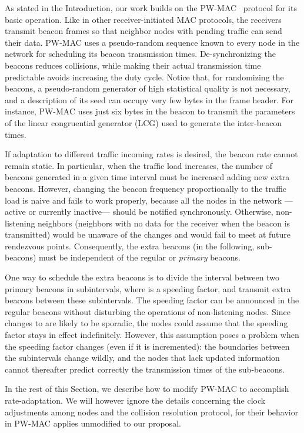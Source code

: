 \documentclass[journal,english,twocolumn,10pt,letterpaper]{IEEEtran}
\begin{document}
As stated in the Introduction, our work builds on the
PW-MAC~\cite{tang11:_pw_macy} protocol for its basic operation. Like in other
receiver-initiated MAC protocols, the receivers transmit beacon frames so that
neighbor nodes with pending traffic can send their data. PW-MAC uses a
pseudo-random sequence known to every node in the network for scheduling its
beacon transmission times. De-synchronizing the beacons reduces collisions,
while making their actual transmission time predictable avoids increasing the
duty cycle. Notice that, for randomizing the beacons, a pseudo-random
generator of high statistical quality is not necessary, and a description of
its seed can occupy very few bytes in the frame header. For instance, PW-MAC
uses just six bytes in the beacon to transmit the parameters of the linear
congruential generator (LCG) used to generate the inter-beacon times.

If adaptation to different traffic incoming rates is desired, the beacon rate
cannot remain static. In particular, when the traffic load increases, the
number of beacons generated in a given time interval must be increased adding
new extra beacons. However, changing the beacon frequency proportionally to
the traffic load is naive and fails to work properly, because all the nodes in
the network ---active or currently inactive--- should be notified
synchronously. Otherwise, non-listening neighbors (neighbors with no data for
the receiver when the beacon is transmitted) would be unaware of the changes
and would fail to meet at future rendezvous points. Consequently, the extra
beacons (in the following, sub-beacons) must be independent of the regular or
\emph{primary} beacons.

One way to schedule the extra beacons is to divide the interval between two
primary beacons in  subintervals, where  is a speeding factor, and
transmit extra beacons between these subintervals. The speeding factor can be
announced in the regular beacons without disturbing the operations of
non-listening nodes. Since changes to  are likely to be sporadic, the nodes
could assume that the speeding factor stays in effect indefinitely. However,
this assumption poses a problem when the speeding factor changes (even if it
is incremented): the boundaries between the subintervals change wildly, and
the nodes that lack updated information cannot thereafter predict correctly
the transmission times of the sub-beacons.

In the rest of this Section, we describe how to modify PW-MAC to accomplish
rate-adaptation. We will however ignore the details concerning the clock
adjustments among nodes and the collision resolution protocol, for their
behavior in PW-MAC applies unmodified to our proposal.
\end{document}
